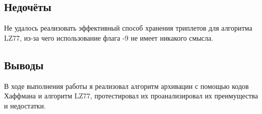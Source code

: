 \documentclass[12pt]{article}
\begin{document}
    \subsection*{Недочёты}
    Не удалось реализовать эффективный способ хранения триплетов для алгоритма 
    LZ77, из-за чего использование флага -9 не имеет никакого смысла.

    \subsection*{Выводы}
    В ходе выполнения работы я реализовал алгоритм архивации с помощью 
    кодов Хаффмана и алгоритм LZ77, протестировал их проанализировал их 
    преимущества и недостатки.
\end{document}
